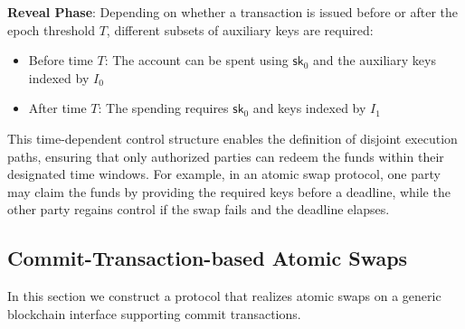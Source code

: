 \textbf{Reveal Phase}: Depending on whether a transaction is issued before or after the epoch threshold $T$, different subsets of auxiliary keys are required:
\begin{itemize}
    \item Before time $T$: The account can be spent using $\mathsf{sk}_0$ and the auxiliary keys indexed by $I_0$
    \item After time $T$: The spending requires $\mathsf{sk}_0$ and keys indexed by $I_1$
\end{itemize}
This time-dependent control structure enables the definition of disjoint execution paths, ensuring that only authorized parties can redeem the funds within their designated time windows. For example, in an atomic swap protocol, one party may claim the funds by providing the required keys before a deadline, while the other party regains control if the swap fails and the deadline elapses.

\subsection{Commit-Transaction-based Atomic Swaps}
In this section we construct a protocol that realizes atomic swaps on a generic blockchain interface supporting commit transactions.

